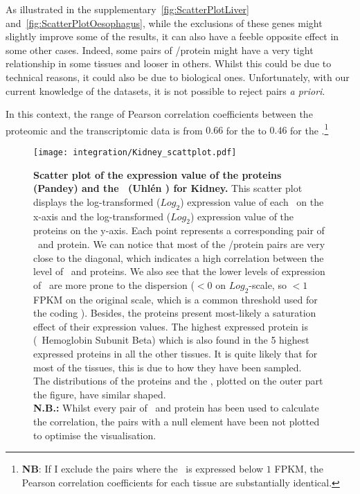 As illustrated in the supplementary~\cref{fig:ScatterPlotLiver}
and~\cref{fig:ScatterPlotOesophagus}, while the exclusions of these genes might
slightly improve some of the results, it can also have a feeble opposite effect
in some other cases.
Indeed, some pairs of \mRNA/protein might have a very tight relationship in some
tissues and looser in others. Whilst this could be due to technical reasons, it
could also be due to biological ones. Unfortunately, with our current knowledge
of the datasets, it is not possible to reject pairs \emph{a priori}.

In this context, the range of Pearson correlation coefficients between the
proteomic and the transcriptomic data is from $0.66$ for the 
to $0.46$ for the .\footnote{\textbf{NB}: If I exclude the
pairs where the \mRNA\ is expressed below $1$ \gls{FPKM}, the Pearson correlation
coefficients for each tissue are substantially identical.}

\begin{figure}[!htbp]
    \texttt{[image: integration/Kidney\_scattplot.pdf]}\centering
    \caption[Scatter plot of the expression value of the proteins (Pandey)
    and the \mRNAs\ (Uhlén \etal) for Kidney]
    {\label{fig:ScatKid}\textbf{Scatter plot of the expression value of the
    proteins (Pandey) and the \mRNAs\ (Uhlén \etal) for Kidney.}
    This scatter plot displays the
    log-transformed ($Log_{2}$) expression value of
    each \mRNA\ on the x-axis and the log-transformed ($Log_{2}$)
    expression value of the proteins on the
    y-axis. Each point represents a corresponding pair of \mRNA\ and protein.
    We can notice that most of the \mRNA/protein pairs are very close to
    the diagonal, which indicates a high correlation between the level
    of \mRNAs\ and proteins. We also see that the lower levels of expression of
    \mRNAs\ are more prone to the dispersion ($<0$ on $Log_{2}$-scale, so $<1$
    \gls{FPKM} on the original scale, which is a common threshold used for the
    coding \mRNAs). Besides, the proteins present most-likely a
    saturation effect of their expression values. The highest expressed protein
    is 
    (\ie\ Hemoglobin Subunit Beta) which is also found in the 5 highest
    expressed proteins in all the other tissues. It is quite likely that for
    most of the tissues, this is due to how they have been sampled.
    \\The distributions of the proteins and the \mRNAs, plotted on the outer part
    the figure, have similar shaped.\\
    \textbf{N.B.:} Whilst every pair of \mRNA\ and protein has been used to
    calculate the correlation, the pairs with a null element have been not plotted
    to optimise the visualisation.}
\end{figure}

